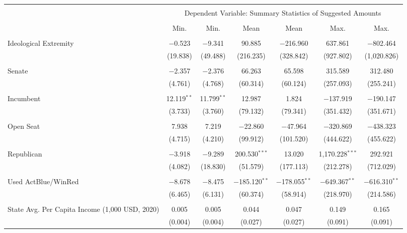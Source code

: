 
\begin{tabular}{@{\extracolsep{5pt}}lcccccc} 
\\[-1.8ex]\hline 
\hline \\[-1.8ex] 
 & \multicolumn{6}{c}{Dependent Variable: Summary Statistics of Suggested Amounts} \\ 
\cline{2-7} 
\\[-1.8ex] & Min. & Min. & Mean & Mean & Max. & Max. \\ 
\hline \\[-1.8ex] 
 Ideological Extremity & $-$0.523 & $-$9.341 & 90.885 & $-$216.960 & 637.861 & $-$802.464 \\ 
  & (19.838) & (49.488) & (216.235) & (328.842) & (927.802) & (1,020.826) \\ 
  & & & & & & \\ 
 Senate & $-$2.357 & $-$2.376 & 66.263 & 65.598 & 315.589 & 312.480 \\ 
  & (4.761) & (4.768) & (60.314) & (60.124) & (257.093) & (255.241) \\ 
  & & & & & & \\ 
 Incumbent & 12.119$^{**}$ & 11.799$^{**}$ & 12.987 & 1.824 & $-$137.919 & $-$190.147 \\ 
  & (3.733) & (3.760) & (79.132) & (79.341) & (351.432) & (351.671) \\ 
  & & & & & & \\ 
 Open Seat & 7.938 & 7.219 & $-$22.860 & $-$47.964 & $-$320.869 & $-$438.323 \\ 
  & (4.715) & (4.210) & (99.912) & (101.520) & (444.622) & (455.622) \\ 
  & & & & & & \\ 
 Republican & $-$3.918 & $-$9.289 & 200.530$^{***}$ & 13.020 & 1,170.228$^{***}$ & 292.921 \\ 
  & (4.082) & (18.830) & (51.579) & (177.113) & (212.278) & (712.029) \\ 
  & & & & & & \\ 
 Used ActBlue/WinRed & $-$8.678 & $-$8.475 & $-$185.120$^{**}$ & $-$178.055$^{**}$ & $-$649.367$^{**}$ & $-$616.310$^{**}$ \\ 
  & (6.465) & (6.131) & (60.374) & (58.914) & (218.970) & (214.586) \\ 
  & & & & & & \\ 
 State Avg. Per Capita Income (1,000 USD, 2020) & 0.005 & 0.005 & 0.044 & 0.047 & 0.149 & 0.165 \\ 
  & (0.004) & (0.004) & (0.027) & (0.027) & (0.091) & (0.091) \\ 

\end{tabular}
